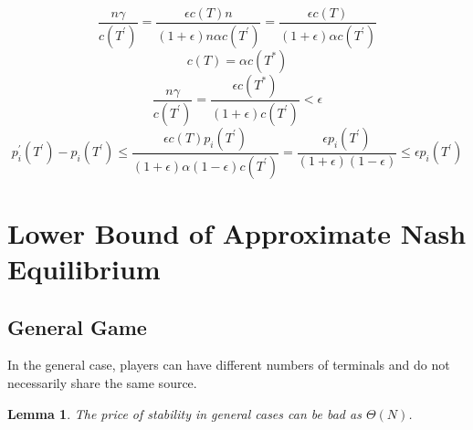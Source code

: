 \documentclass[11pt,psfig,times]{article}
\newtheorem{lemma}{Lemma}[section]
\begin{document}
	
		\[\frac{n\gamma}{c(T^{'})} = \frac{\epsilon c(T) n}{(1+\epsilon)n\alpha c(T^{'})} = \frac{\epsilon c(T) }{(1+\epsilon)\alpha c(T^{'})}\]
		\[c(T) = \alpha c(T^*)\]
		\[\frac{n\gamma}{c(T^{'})} = \frac{\epsilon c(T^*)}{(1+\epsilon)c(T^{'})} < \epsilon\]
		\[p_i^{'}(T^{'}) - p_i(T^{'}) \leq \frac{\epsilon c(T) p_i(T^{'}) }{(1+\epsilon)\alpha (1-\epsilon) c(T^{'}) } = \frac{\epsilon  p_i(T^{'}) }{(1+\epsilon) (1-\epsilon) } \leq \epsilon p_i(T^{'})\]
	
		
\section{Lower Bound of Approximate Nash Equilibrium}
	
\subsection{General Game}
In the general case, players can have different numbers of terminals and do not necessarily share the same source.

\begin{lemma}
	The price of stability in general cases can be bad as $\Theta(N)$.
\end{lemma}
\end{document}
